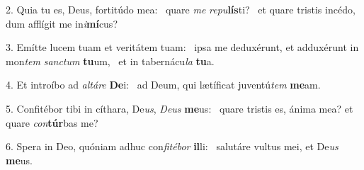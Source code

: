 2. Quia tu es, Deus, fortitúdo mea: \dag\  quare \textit{me} \textit{re}\textit{pu}\textbf{lís}ti? \ast\  et quare tristis incédo, dum afflígit me in\textit{i}\textbf{mí}cus?\

3. Emítte lucem tuam et veritátem tuam: \dag\  ipsa me deduxérunt, et adduxérunt in mon\textit{tem} \textit{sanc}\textit{tum} \textbf{tu}um, \ast\  et in tabernácu\textit{la} \textbf{tu}a.\

4. Et introíbo ad \textit{al}\textit{tá}\textit{re} \textbf{De}i: \ast\  ad Deum, qui lætíficat juventú\textit{tem} \textbf{me}am.\

5. Confitébor tibi in cíthara, De\textit{us}, \textit{De}\textit{us} \textbf{me}us: \ast\  quare tristis es, ánima mea? et quare \textit{con}\textbf{túr}bas me?\

6. Spera in Deo, quóniam adhuc con\textit{fi}\textit{té}\textit{bor} \textbf{il}li: \ast\  salutáre vultus mei, et De\textit{us} \textbf{me}us.\

